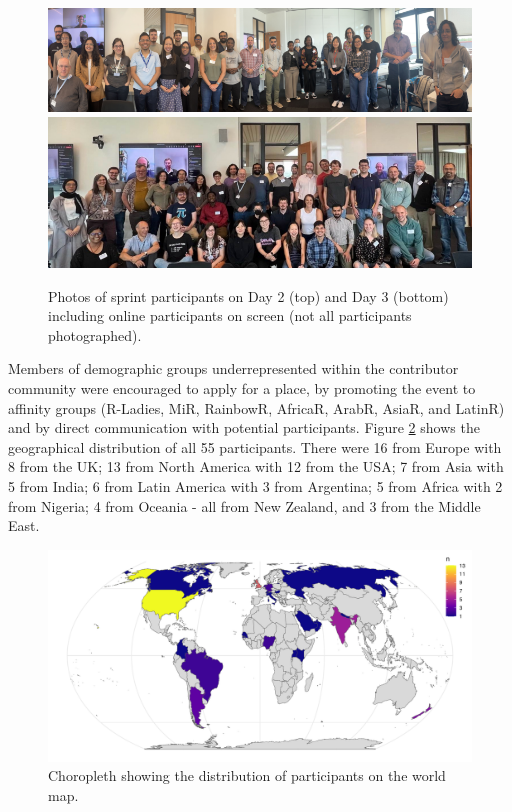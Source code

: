 \begin{figure}
\includegraphics[width=1\linewidth]{images/group_thursday} \includegraphics[width=1\linewidth]{images/group_friday} \caption{Photos of sprint participants on Day 2 (top) and Day 3 (bottom) including online participants on screen (not all participants photographed).}\label{fig:photos}
\end{figure}

Members of demographic groups underrepresented within the contributor community
were encouraged to apply for a place, by promoting the event to affinity groups (R-Ladies, MiR, RainbowR, AfricaR, ArabR, AsiaR, and LatinR) and by direct
communication with potential participants. Figure \ref{fig:map} shows the
geographical distribution of all 55 participants. There were 16 from Europe with 8 from the UK; 13 from North America with 12 from the USA;
7 from Asia with 5 from India; 6 from Latin America with 3 from Argentina; 5 from Africa with 2 from Nigeria; 4 from Oceania - all from New Zealand, and 3 from the Middle East.

\begin{figure}
\includegraphics[width=1\linewidth]{figures/participant_map} \caption{Choropleth showing the distribution of participants on the world map.}\label{fig:map}
\end{figure}

